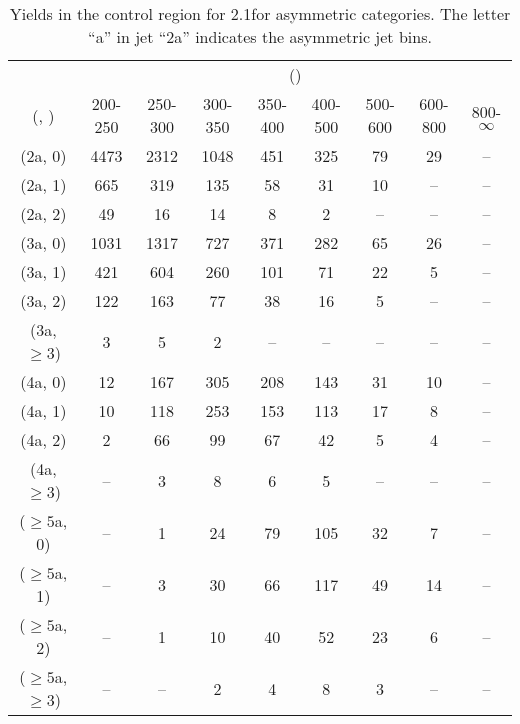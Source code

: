 \begin{table}[h!]
\tiny
\centering
\caption{Yields in the \mj control region for 2.1\ifb for asymmetric categories. The letter ``a'' in jet \eg ``2a''  indicates the asymmetric jet bins.\label{tab:yieldssep_mu_data_asym}}
\begin{tabular}
{ccccccccc}
	\hline\hline
	& \multicolumn{8}{c}{\scalht (\gev)} \\ 
	 (\njet,  \nb) & 200-250 & 250-300 & 300-350 & 350-400 & 400-500 & 500-600 & 600-800 & 800-$\infty$ \\ [0.8ex] 
\hline
	(2a, 0) & 4473 & 2312 & 1048 & 451 & 325 & 79 & 29 & -- \\[0.5ex] 
	(2a, 1) & 665 & 319 & 135 & 58 & 31 & 10 & -- & -- \\[0.5ex] 
	(2a, 2) & 49 & 16 & 14 & 8 & 2 & -- & -- & -- \\[0.5ex] 
	(3a, 0) & 1031 & 1317 & 727 & 371 & 282 & 65 & 26 & -- \\[0.5ex] 
	(3a, 1) & 421 & 604 & 260 & 101 & 71 & 22 & 5 & -- \\[0.5ex] 
	(3a, 2) & 122 & 163 & 77 & 38 & 16 & 5 & -- & -- \\[0.5ex] 
	(3a, $\ge3$) & 3 & 5 & 2 & -- & -- & -- & -- & -- \\[0.5ex] 
	(4a, 0) & 12 & 167 & 305 & 208 & 143 & 31 & 10 & -- \\[0.5ex] 
	(4a, 1) & 10 & 118 & 253 & 153 & 113 & 17 & 8 & -- \\[0.5ex] 
	(4a, 2) & 2 & 66 & 99 & 67 & 42 & 5 & 4 & -- \\[0.5ex] 
	(4a, $\ge3$) & -- & 3 & 8 & 6 & 5 & -- & -- & -- \\[0.5ex] 
	($\ge5$a, 0) & -- & 1 & 24 & 79 & 105 & 32 & 7 & -- \\[0.5ex] 
	($\ge5$a, 1) & -- & 3 & 30 & 66 & 117 & 49 & 14 & -- \\[0.5ex] 
	($\ge5$a, 2) & -- & 1 & 10 & 40 & 52 & 23 & 6 & -- \\[0.5ex] 
	($\ge5$a, $\ge3$) & -- & -- & 2 & 4 & 8 & 3 & -- & -- \\[0.5ex] 
	\hline
	\hline
\end{tabular}
\end{table}
